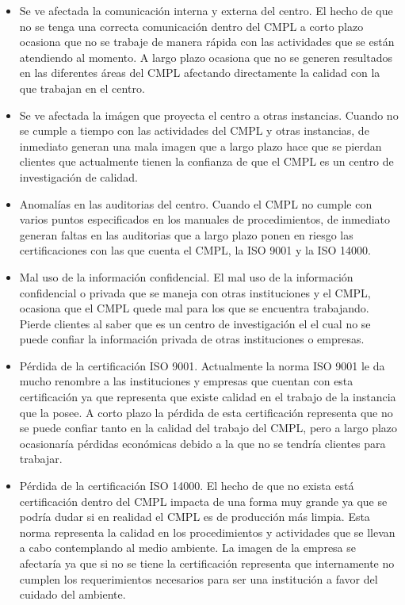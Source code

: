 \begin{itemize}
	\item Se ve afectada la comunicación interna y externa del centro.	
El hecho de que no se tenga una correcta comunicación dentro del CMPL a corto plazo ocasiona que no se trabaje de manera rápida con las actividades que se están atendiendo al momento. A largo plazo ocasiona que no se generen resultados en las diferentes áreas del CMPL afectando directamente la calidad con la que trabajan en el centro. 

	\item Se ve afectada la imágen que proyecta el centro a otras instancias.
Cuando no se cumple a tiempo con las actividades del CMPL y otras instancias, de inmediato generan una mala imagen que a largo plazo hace que se pierdan clientes que actualmente tienen la confianza de que el CMPL es un centro de investigación de calidad.

	\item Anomalías en las auditorias del centro.
Cuando el CMPL no cumple con varios puntos especificados en los manuales de procedimientos, de inmediato generan faltas en las auditorias que a largo plazo ponen en riesgo las certificaciones con las que cuenta el CMPL, la ISO 9001 y la ISO 14000. 

	\item Mal uso de la información confidencial.
El mal uso de la información confidencial o privada que se maneja con otras instituciones y el CMPL, ocasiona que el CMPL quede mal para los que se encuentra trabajando. Pierde clientes al saber que es un centro de investigación el el cual no se puede confiar la información privada de otras instituciones o empresas.

	\item Pérdida de la certificación ISO 9001.
Actualmente la norma ISO 9001 le da mucho renombre a las instituciones y empresas que cuentan con esta certificación ya que representa que existe calidad en el trabajo de la instancia que la posee. A corto plazo la pérdida de esta certificación representa que no se puede confiar tanto en la calidad del trabajo del CMPL, pero a largo plazo ocasionaría pérdidas económicas debido a la que no se tendría clientes para trabajar.
	\item Pérdida de la certificación ISO 14000.
El hecho de que no exista está certificación dentro del CMPL impacta de una forma muy grande ya que se podría dudar si en realidad el CMPL es de producción más limpia. Esta norma representa la calidad en los procedimientos y actividades que se llevan a cabo contemplando al medio ambiente. La imagen de la empresa se afectaría ya que si no se tiene la certificación representa que internamente no cumplen los requerimientos necesarios para ser una institución a favor del cuidado del ambiente.	
\end{itemize}

